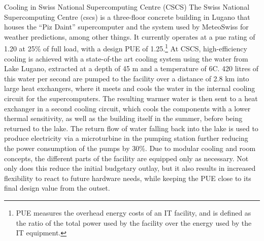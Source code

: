\documentclass[../SustainableHEP.tex]{subfiles}
\begin{document}
\begin{bestpractice}{Cooling in Swiss National Supercomputing Centre (CSCS)}%
    The Swiss National Supercomputing Centre (\acrshort{cscs}) is a three-floor concrete building in Lugano that houses the “Piz Daint” supercomputer and the system used by MeteoSwiss for weather predictions, among other things.  It currently operates at a \acrshort{pue} rating of 1.20 at 25\% of full load, with a design PUE of 1.25.\footnote{PUE measures the overhead energy costs of an IT facility, and is defined as the ratio of the total power used by the facility over the energy used by the IT equipment.}
    At CSCS, high-efficiency cooling is achieved with a state-of-the art cooling system using the water from Lake Lugano, extracted at a depth of 45 m 
    and a temperature of 6\degree C. 420 litres of this water per second are pumped to the facility over a distance of 2.8 km into large heat exchangers, where it meets and cools the water in the internal cooling circuit for the supercomputers. The resulting warmer water is then sent to a heat exchanger in a second cooling circuit, which cools the components with a lower thermal sensitivity, as well as the building itself in the summer, before being returned to the lake. The return flow of water falling back into the lake is used to produce electricity via a microturbine in the pumping station further reducing the power consumption of the pumps by 30\%.  Due to modular cooling and room concepts, the different parts of the facility are equipped only as necessary.  Not only does this reduce the initial budgetary outlay, but it also results in increased flexibility to react to future hardware needs, while keeping the PUE close to its final design value from the outset.
\end{bestpractice}
\end{document}
